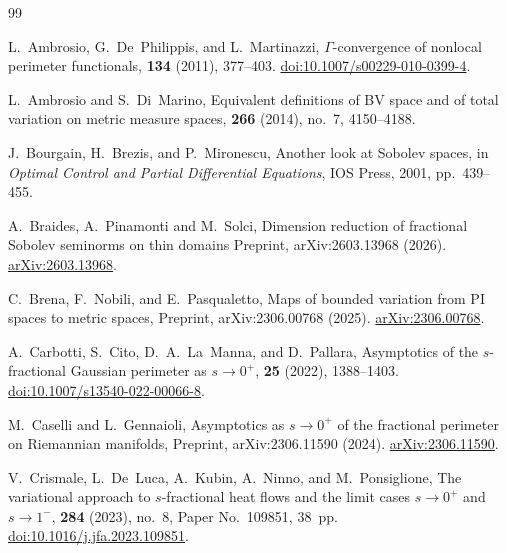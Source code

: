 \documentclass[reqno,11pt]{amsart}
\numberwithin{equation}{section}
\theoremstyle{definition} %
\theoremstyle{plain}
\theoremstyle{definition}
\theoremstyle{remark}
\begin{document}
\begin{thebibliography}{99}

L.~Ambrosio, G.~De~Philippis, and L.~Martinazzi,
\newblock $\Gamma$-convergence of nonlocal perimeter functionals,
 \textbf{134} (2011), 377--403.
\newblock \href{https://doi.org/10.1007/s00229-010-0399-4}{doi:10.1007/s00229-010-0399-4}.

L.~Ambrosio and S.~Di~Marino,
\newblock Equivalent definitions of {BV} space and of total variation on metric measure spaces,
 \textbf{266} (2014), no.~7, 4150--4188.


J.~Bourgain, H.~Brezis, and P.~Mironescu,
\newblock Another look at {S}obolev spaces,
\newblock in {\em Optimal Control and Partial Differential Equations}, IOS Press, 2001, pp.~439--455.

A.~Braides, A.~Pinamonti and M.~Solci,
\newblock Dimension reduction of fractional {S}obolev seminorms on thin domains
\newblock Preprint, arXiv:2603.13968 (2026).
\newblock \href{https://arxiv.org/abs/2603.13968}{arXiv:2603.13968}.

C.~Brena, F.~Nobili, and E.~Pasqualetto,
\newblock Maps of bounded variation from {PI} spaces to metric spaces,
\newblock Preprint, arXiv:2306.00768 (2025).
\newblock \href{https://arxiv.org/abs/2306.00768}{arXiv:2306.00768}.

A.~Carbotti, S.~Cito, D.~A.~La~Manna, and D.~Pallara,
\newblock Asymptotics of the $s$-fractional {G}aussian perimeter as $s\rightarrow 0^+$,
 \textbf{25} (2022), 1388--1403.
\newblock \href{https://doi.org/10.1007/s13540-022-00066-8}{doi:10.1007/s13540-022-00066-8}.

M.~Caselli and L.~Gennaioli,
\newblock Asymptotics as $s \to 0^+$ of the fractional perimeter on {R}iemannian manifolds,
\newblock Preprint, arXiv:2306.11590 (2024).
\newblock \href{https://arxiv.org/abs/2306.11590}{arXiv:2306.11590}.

V.~Crismale, L.~De~Luca, A.~Kubin, A.~Ninno, and M.~Ponsiglione,
\newblock The variational approach to $s$-fractional heat flows and the limit cases $s\to0^+$ and $s\to1^-$,
 \textbf{284} (2023), no.~8, Paper No.~109851, 38~pp.
\newblock \href{https://doi.org/10.1016/j.jfa.2023.109851}{doi:10.1016/j.jfa.2023.109851}.


\end{thebibliography}
\end{document}

